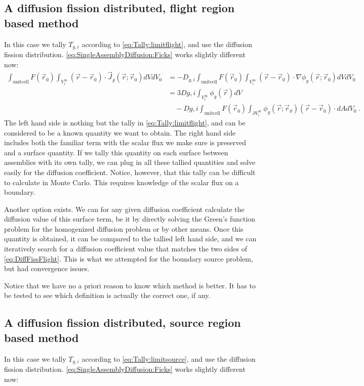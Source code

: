 \documentclass[a4paper,letterpaper,12pt,oneside,draft]{article}
\newcommand{\eep}{\;.}
\newcommand{\vr}{\ensuremath{\vec{r}}}
\newcommand{\dvr}{\left(\vr-\vr_0\right)}
\begin{document}
\subsection{A diffusion fission distributed, flight region based method}
In this case we tally $T_{g,i}$ according to \cref{eq:Tally:limitflight}, and use the diffusion fission distribution. \cref{eq:SingleAssemblyDiffusion:Ficks} works slightly different now:
\begin{align}
    \nonumber
    \int_{\text{unitcell}} F(\vr_0)\int_{V_i^\infty} \dvr\cdot\vec{J}_g(\vr;\vr_0) dVdV_0 &= -D_{g,i} \int_{\text{unitcell}} F(\vr_0) \int_{V_i^\infty} \dvr\cdot\nabla \phi_g(\vr;\vr_0)dVdV_0 \\\nonumber
    &= 3D{g,i} \int_{V_i^\infty}\phi_g(\vr)dV \\ 
    \label{eq:DiffFissFlight}
    &\quad -D{g,i}\int_{\text{unitcell}} F(\vr_0) \int_{\partial V_i^\infty}\phi_g(\vr;\vr_0)\dvr\cdot dAdV_0 \eep
\end{align}
The left hand side is nothing but the tally in \cref{eq:Tally:limitflight}, and can be considered to be a known quantity we want to obtain.
The right hand side includes both the familiar term with the scalar flux we make sure is preserved and a surface quantity. 
If we tally this quantity on each surface between assemblies with its own tally, we can plug in all these tallied quantities and solve easily for the diffusion coefficient.
Notice, however, that this tally can be difficult to calculate in Monte Carlo. 
This requires knowledge of the scalar flux on a boundary.

Another option exists. 
We can for any given diffusion coefficient calculate the diffusion value of this surface term, be it by directly solving the Green's function problem for the homogenized diffusion problem or by other means.
Once this quantity is obtained, it can be compared to the tallied left hand side, and we can iteratively search for a diffusion coefficient value that matches the two sides of \cref{eq:DiffFissFlight}.
This is what we attempted for the boundary source problem, but had convergence issues.

Notice that we have no a priori reason to know which method is better.
It has to be tested to see which definition is actually the correct one, if any.

\subsection{A diffusion fission distributed, source region based method}
In this case we tally $T_{g,i}$ according to \cref{eq:Tally:limitsource}, and use the diffusion fission distribution. \cref{eq:SingleAssemblyDiffusion:Ficks} works slightly different now:
\end{document}

